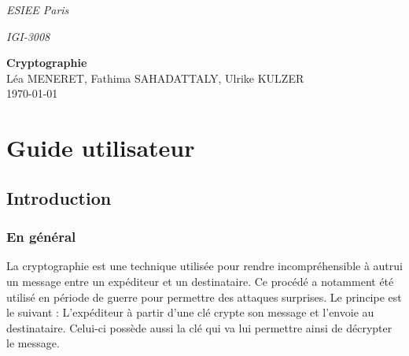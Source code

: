 \documentclass[a4paper,12pt,abstracton,titlepage]{scrartcl}
\begin{document}

{\Large\noindent \emph{ESIEE Paris}}

{\Large\noindent \emph{IGI-3008}}
\vspace{1cm}
\begin{center}
	{\huge \textbf{Cryptographie}
	\\
	\vspace{0.3cm}
	\large Léa MENERET, Fathima SAHADATTALY, Ulrike KULZER
	\\
	\vspace{0.2cm}
	\today}
\end{center}
\vspace{1cm}
\tableofcontents

\setcounter{page}{1} %

\newpage
\section{Guide utilisateur}
\subsection{Introduction}
\subsubsection{En général}
La cryptographie est une technique utilisée pour rendre incompréhensible à autrui un message entre un expéditeur et un destinataire. Ce procédé a notamment été utilisé en période de guerre pour permettre des attaques surprises. 
Le principe est le suivant : L'expéditeur à partir d'une clé crypte son message et l'envoie au destinataire. Celui-ci possède aussi la clé qui va lui permettre ainsi de décrypter le message.
\end{document}
